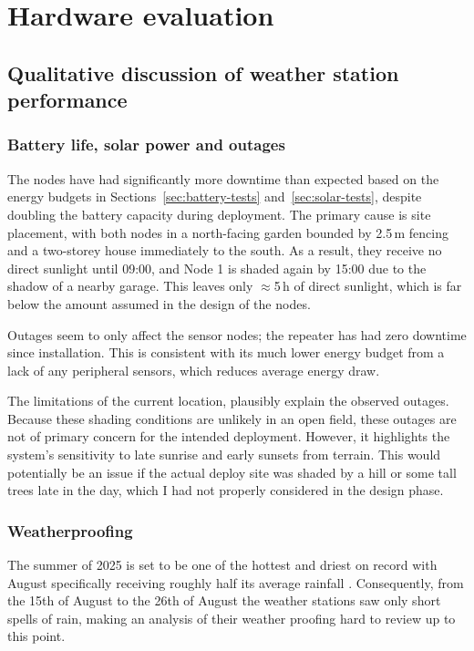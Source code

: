 \section{Hardware evaluation}\label{hardware-evaluation}

\subsection{Qualitative discussion of weather station performance}

\subsubsection{Battery life, solar power and
  outages}\label{sec:hardware-evaluation-power}

The nodes have had significantly more downtime than expected based on the energy
budgets in Sections~\ref{sec:battery-tests} and~\ref{sec:solar-tests}, despite
doubling the battery capacity during deployment. The primary cause is site
placement, with both nodes in a north-facing garden bounded by 2.5\,m fencing
and a two-storey house immediately to the south. As a result, they receive no
direct sunlight until 09:00, and Node 1 is shaded again by 15:00 due to the
shadow of a nearby garage. This leaves only \(\approx\)5\,h of direct sunlight,
which is far below the amount assumed in the design of the nodes.

Outages seem to only affect the sensor nodes; the repeater has had zero downtime
since installation. This is consistent with its much lower energy budget from a
lack of any peripheral sensors, which reduces average energy draw.

The limitations of the current location, plausibly explain the observed outages.
Because these shading conditions are unlikely in an open field, these outages
are not of primary concern for the intended deployment. However, it highlights
the system's sensitivity to late sunrise and early sunsets from terrain. This
would potentially be an issue if the actual deploy site was shaded by a hill or
some tall trees late in the day, which I had not properly considered in the
design phase.

\subsubsection{Weatherproofing}

The summer of 2025 is set to be one of the hottest and driest on record with
August specifically receiving roughly half its average rainfall
\cite{uor2025summer}. Consequently, from the 15th of August to the 26th of
August the weather stations saw only short spells of rain, making an analysis of
their weather proofing hard to review up to this point.

